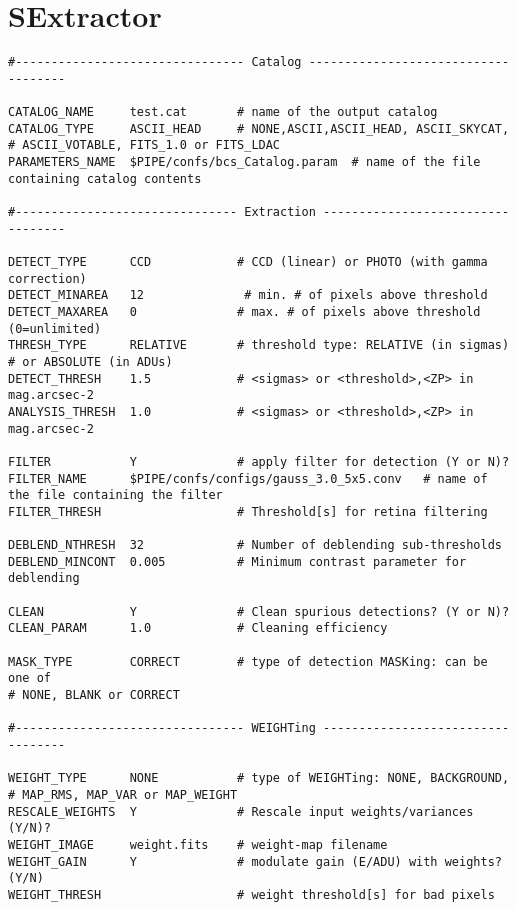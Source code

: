 \documentclass[apj, revtex4]{emulateapj}
\begin{document}
\section{SExtractor}\label{app:sextractor}
\begin{verbatim}
#-------------------------------- Catalog ------------------------------------

CATALOG_NAME     test.cat       # name of the output catalog
CATALOG_TYPE     ASCII_HEAD     # NONE,ASCII,ASCII_HEAD, ASCII_SKYCAT,
# ASCII_VOTABLE, FITS_1.0 or FITS_LDAC
PARAMETERS_NAME  $PIPE/confs/bcs_Catalog.param  # name of the file containing catalog contents

#------------------------------- Extraction ----------------------------------

DETECT_TYPE      CCD            # CCD (linear) or PHOTO (with gamma correction)
DETECT_MINAREA   12              # min. # of pixels above threshold
DETECT_MAXAREA   0              # max. # of pixels above threshold (0=unlimited)
THRESH_TYPE      RELATIVE       # threshold type: RELATIVE (in sigmas)
# or ABSOLUTE (in ADUs)
DETECT_THRESH    1.5            # <sigmas> or <threshold>,<ZP> in mag.arcsec-2
ANALYSIS_THRESH  1.0            # <sigmas> or <threshold>,<ZP> in mag.arcsec-2

FILTER           Y              # apply filter for detection (Y or N)?
FILTER_NAME      $PIPE/confs/configs/gauss_3.0_5x5.conv   # name of the file containing the filter
FILTER_THRESH                   # Threshold[s] for retina filtering

DEBLEND_NTHRESH  32             # Number of deblending sub-thresholds
DEBLEND_MINCONT  0.005          # Minimum contrast parameter for deblending

CLEAN            Y              # Clean spurious detections? (Y or N)?
CLEAN_PARAM      1.0            # Cleaning efficiency

MASK_TYPE        CORRECT        # type of detection MASKing: can be one of
# NONE, BLANK or CORRECT

#-------------------------------- WEIGHTing ----------------------------------

WEIGHT_TYPE      NONE           # type of WEIGHTing: NONE, BACKGROUND,
# MAP_RMS, MAP_VAR or MAP_WEIGHT
RESCALE_WEIGHTS  Y              # Rescale input weights/variances (Y/N)?
WEIGHT_IMAGE     weight.fits    # weight-map filename
WEIGHT_GAIN      Y              # modulate gain (E/ADU) with weights? (Y/N)
WEIGHT_THRESH                   # weight threshold[s] for bad pixels


\end{verbatim}
\end{document}
